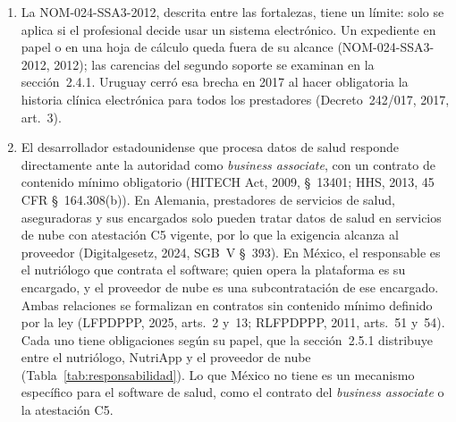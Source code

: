 \documentclass[12pt, a4paper]{article}
\begin{document}
\begin{enumerate}[label=\Roman*.]
  \item La NOM-024-SSA3-2012, descrita entre las fortalezas, tiene
  un límite: solo se aplica si el profesional decide usar un sistema
  electrónico. Un expediente en papel o en una hoja de cálculo
  queda fuera de su alcance (NOM-024-SSA3-2012, 2012); las carencias
  del segundo soporte se examinan en la sección~2.4.1.
  Uruguay cerró esa brecha en 2017 al hacer obligatoria la historia
  clínica electrónica para todos los prestadores (Decreto~242/017,
  2017, art.~3).
 
 
  \item El desarrollador estadounidense que procesa datos de salud
  responde directamente ante la autoridad como \textit{business
  associate}, con un contrato de contenido mínimo obligatorio
  (HITECH Act, 2009, \S~13401; HHS, 2013, 45 CFR \S~164.308(b)).
  En Alemania, prestadores de servicios de salud, aseguradoras y sus
  encargados solo pueden tratar datos de salud en servicios de nube con
  atestación C5 vigente, por lo que la exigencia alcanza al proveedor
  (Digitalgesetz, 2024, SGB~V \S~393). En México, el responsable es el
  nutriólogo que contrata el software; quien opera la plataforma es su
  encargado, y el proveedor de nube es una subcontratación de ese
  encargado. Ambas relaciones se formalizan en contratos sin contenido
  mínimo definido por la ley (LFPDPPP, 2025, arts.~2 y~13; RLFPDPPP, 2011,
  arts.~51 y~54). Cada uno tiene obligaciones según su papel, que la sección~2.5.1 distribuye entre el nutriólogo, NutriApp y el proveedor de nube (Tabla~\ref{tab:responsabilidad}). Lo que México no tiene es un
  mecanismo específico para el software de salud, como el contrato del \textit{business associate} o la atestación C5.
 

\end{enumerate}
\end{document}
